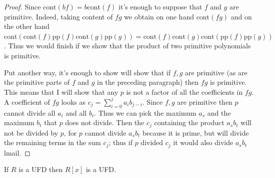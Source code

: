 \begin{proof}
Since $\text{cont}(bf)=b\text{cont}(f)$ it's
enough to suppose that  $f$ and $g$
are primitive. Indeed, taking content of $fg$
we obtain on one hand
$\text{cont}(fg)$ and on the other hand
$\text{cont}(\text{cont}(f)\text{pp}(f)
\text{cont}(g)\text{pp}(g))
=\text{cont}(f)\text{cont}(g)\text{cont}
(\text{pp}(f)\text{pp}(g))$.
Thus we would finish if we show that the
product of two primitive polynomials is
primitive.

Put another way, it's enough to show will
show that if $f,g$ are primitive (as
are the primitive parts of $f$ and $g$ in the
preceding paragraph) then $fg$ is
primitive. This means that I will show that
any $p$ is not a factor of all the
coefficients in $fg$. A coefficient of $fg$
looks as
$c_j=\sum_{i=0}^ja_ib_{j-i}$.  Since $f,g$
are primitive then $p$ cannot divide
all $a_i$ and all $b_i$.  Thus we can pick
the maximum $a_s$ and the maximum
$b_t$ that $p$ does not divide. Then the
$c_j$ containing the product $a_sb_t$
will not be divided by $p$, for $p$ cannot
divide $a_sb_t$ because it is prime,
but will divide the remaining terms in the
sum $c_j$; thus if $p$ divided $c_j$
it would also divide $a_sb_t$lmail.
\end{proof}

\begin{lemma}[Gauss]
\label{lemma-R-UFD-implies-R[x]-UFD}
\begin{reference}
\cite[Chapter 4, Theorem 2.3]{Lang-algebra}
\end{reference}
If $R$ is a UFD then $R[x]$ is a UFD.
\end{lemma}

